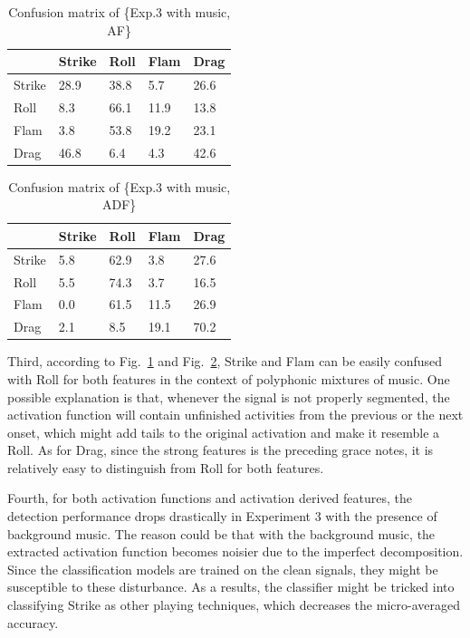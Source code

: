 \documentclass{article}
\begin{document}
{{{{{{{{{\begin{table}[]
\centering
\begin{tabular}{l|llll}
       & Strike & Roll & Flam & Drag \\ \hline
Strike & 28.9   & 38.8 & 5.7  & 26.6 \\
Roll   & 8.3    & 66.1 & 11.9 & 13.8 \\
Flam   & 3.8    & 53.8 & 19.2 & 23.1 \\
Drag   & 46.8   & 6.4  & 4.3  & 42.6
\end{tabular}
\caption{Confusion matrix of \{Exp.3 with music, AF\}}
\label{EXP3_music_AF}
\end{table}

\begin{table}[]
\centering
\begin{tabular}{l|llll}
       & Strike & Roll & Flam & Drag \\ \hline
Strike & 5.8    & 62.9 & 3.8  & 27.6 \\
Roll   & 5.5    & 74.3 & 3.7  & 16.5 \\
Flam   & 0.0    & 61.5 & 11.5 & 26.9 \\
Drag   & 2.1    & 8.5  & 19.1 & 70.2
\end{tabular}
\caption{Confusion matrix of \{Exp.3 with music, ADF\}}
\label{EXP3_music_ADF}
\end{table}

Third, according to Fig.~\ref{EXP3_music_AF} and Fig.~\ref{EXP3_music_ADF}, Strike and Flam can be easily confused with Roll for both features in the context of polyphonic mixtures of music. One possible explanation is that, whenever the signal is not properly segmented, the activation function will contain unfinished activities from the previous or the next onset, which might add tails to the original activation and make it resemble a Roll. As for Drag, since the strong features is the preceding grace notes, it is relatively easy to distinguish from Roll for both features.  

Fourth, for both activation functions and activation derived features, the detection performance drops drastically in Experiment 3 with the presence of background music. The reason could be that with the background music, the extracted activation function becomes noisier due to the imperfect decomposition. Since the classification models are trained on the clean signals, they might be susceptible to these disturbance. As a results, the classifier might be tricked into classifying Strike as other playing techniques, which decreases the micro-averaged accuracy. 

}}}}}}}}}
\end{document}
